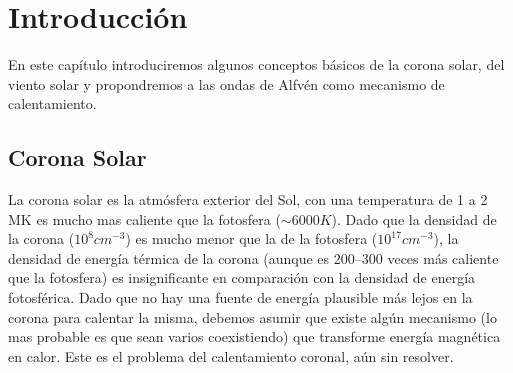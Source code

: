 \documentclass[a4paper,11pt]{report}
\begin{document}
\chapter{Introducción}\label{cap1}
En este capítulo introduciremos algunos conceptos básicos de la corona solar, del viento solar y propondremos a las ondas de Alfvén como mecanismo de calentamiento.
\section{Corona Solar}
La corona solar es la atmósfera exterior del Sol, con una temperatura de 1 a 2 MK es mucho mas caliente que la fotosfera ($\sim 6000K$). Dado que la densidad de la corona ($10^{8} cm^{-3}$) es mucho menor que la de la fotosfera ($10^{17} cm^{-3}$), la densidad de energía térmica de la corona (aunque es 200–300 veces más caliente que la fotosfera) es insignificante en comparación con la densidad de energía fotosférica. 
Dado que no hay una fuente de energía plausible más lejos en la corona para calentar la misma, debemos asumir que existe algún mecanismo (lo mas probable es que sean varios coexistiendo) que transforme energía magnética en calor. Este es el problema del calentamiento coronal, aún sin resolver.
\end{document}
